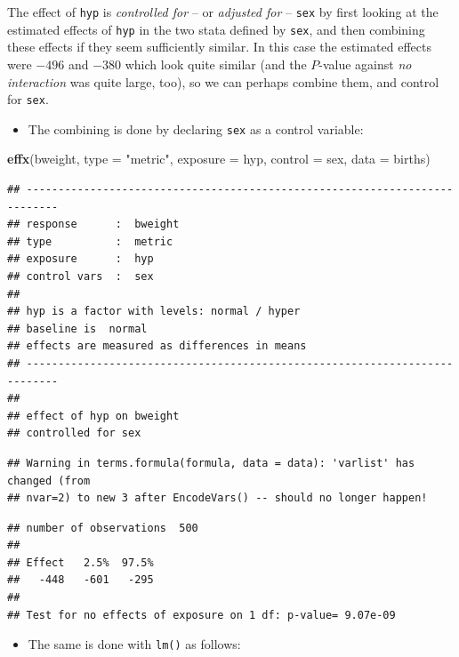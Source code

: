 \documentclass[
]{book}
\newenvironment{Shaded}{\begin{snugshade}}{\end{snugshade}}
\newcommand{\AttributeTok}[1]{\textcolor[rgb]{0.13,0.29,0.53}{#1}}
\newcommand{\FunctionTok}[1]{\textcolor[rgb]{0.13,0.29,0.53}{\textbf{#1}}}
\newcommand{\NormalTok}[1]{#1}
\newcommand{\StringTok}[1]{\textcolor[rgb]{0.31,0.60,0.02}{#1}}
\providecommand{\tightlist}{%
  \setlength{\itemsep}{0pt}\setlength{\parskip}{0pt}}
\begin{document}
The effect of \texttt{hyp} is \emph{controlled for} -- or \emph{adjusted for} -- \texttt{sex}
by first looking at the estimated effects of \texttt{hyp} in the two stata defined by \texttt{sex}, and then combining these effects if they seem sufficiently similar. In this case the estimated effects were \(-496\) and \(-380\) which look quite similar (and the \(P\)-value against \emph{no interaction} was quite large, too),
so we can perhaps combine them, and control for \texttt{sex}.

\begin{itemize}
\tightlist
\item
  The combining is done by declaring \texttt{sex} as a control variable:
\end{itemize}

\begin{Shaded}
\begin{Highlighting}[]
\FunctionTok{effx}\NormalTok{(bweight, }\AttributeTok{type =} \StringTok{"metric"}\NormalTok{, }\AttributeTok{exposure =}\NormalTok{ hyp, }\AttributeTok{control =}\NormalTok{ sex, }\AttributeTok{data =}\NormalTok{ births)}
\end{Highlighting}
\end{Shaded}

\begin{verbatim}
## --------------------------------------------------------------------------- 
## response      :  bweight 
## type          :  metric 
## exposure      :  hyp 
## control vars  :  sex 
## 
## hyp is a factor with levels: normal / hyper 
## baseline is  normal 
## effects are measured as differences in means 
## --------------------------------------------------------------------------- 
## 
## effect of hyp on bweight 
## controlled for sex
\end{verbatim}

\begin{verbatim}
## Warning in terms.formula(formula, data = data): 'varlist' has changed (from
## nvar=2) to new 3 after EncodeVars() -- should no longer happen!
\end{verbatim}

\begin{verbatim}
## number of observations  500 
## 
## Effect   2.5%  97.5% 
##   -448   -601   -295 
## 
## Test for no effects of exposure on 1 df: p-value= 9.07e-09
\end{verbatim}

\begin{itemize}
\tightlist
\item
  The same is done with \texttt{lm()} as follows:
\end{itemize}
\end{document}
